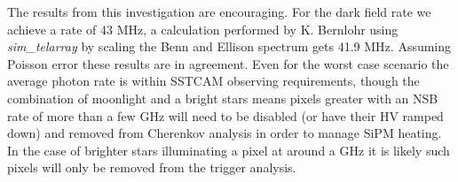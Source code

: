 The results from this investigation are encouraging. For the dark field rate we achieve a rate of 43 MHz, a calculation performed by K. Bernlohr using \textit{sim\_telarray} by scaling the Benn and Ellison spectrum \cite{BandE} gets 41.9 MHz. Assuming Poisson error these results are in agreement. Even for the worst case scenario the average photon rate is within SSTCAM observing requirements, though the combination of moonlight and a bright stars means pixels greater with an NSB rate of more than a few GHz will need to be disabled (or have their HV ramped down) and removed from Cherenkov analysis in order to manage SiPM heating. In the case of brighter stars illuminating a pixel at around a GHz it is likely such pixels will only be removed from the trigger analysis.
\begin{table}[h]
    \centering
    \caption{Observation Parameters for the Four Eta Carinae Runs.  The observing Altitude (ALT) and Azimuth (AZ) are presented, along with the simulated source Right Ascension (RA) and Declination (DEC). The moonlit Eta Carinae runs are at a low altitude that an IACT would not normally observe at, but since the \textit{nsb} model does not contain a full atmospheric model this is inconsequential. Times are in UTC.}
    \label{tab:etacar_params}
\end{table}

